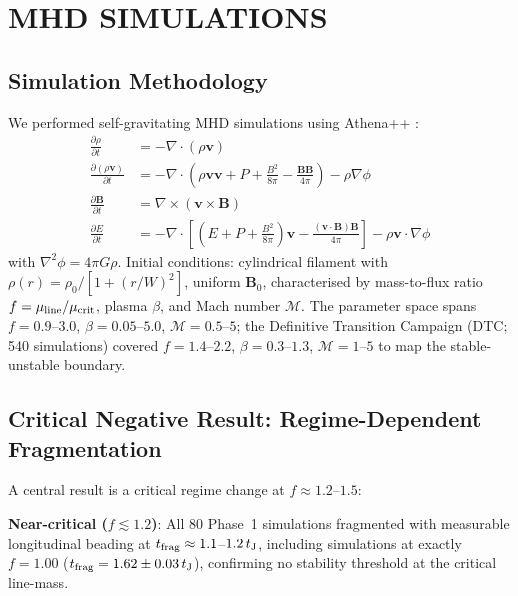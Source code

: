 \documentclass[twoside,twocolumn]{mnras}
\begin{document}
\section{MHD SIMULATIONS}

\subsection{Simulation Methodology}

We performed self-gravitating MHD simulations using Athena++ \citep{Stone2020}:
\begin{align}
\frac{\partial \rho}{\partial t} &= -\nabla \cdot (\rho \mathbf{v}) \\
\frac{\partial (\rho \mathbf{v})}{\partial t} &= -\nabla \cdot \left(\rho \mathbf{v} \mathbf{v} + P + \frac{B^2}{8\pi} - \frac{\mathbf{B}\mathbf{B}}{4\pi}\right) - \rho \nabla \phi \\
\frac{\partial \mathbf{B}}{\partial t} &= \nabla \times (\mathbf{v} \times \mathbf{B}) \\
\frac{\partial E}{\partial t} &= -\nabla \cdot \left[\left(E + P + \frac{B^2}{8\pi}\right)\mathbf{v} - \frac{(\mathbf{v} \cdot \mathbf{B})\mathbf{B}}{4\pi}\right] - \rho \mathbf{v} \cdot \nabla \phi
\end{align}
with $\nabla^2 \phi = 4\pi G\rho$. Initial conditions: cylindrical filament with
$\rho(r) = \rho_0 / [1 + (r/W)^2]$, uniform $\mathbf{B}_0$, characterised by
mass-to-flux ratio $f = \mu_{\rm line}/\mu_{\rm crit}$, plasma $\beta$, and
Mach number $\mathcal{M}$. The parameter space spans $f = 0.9$--$3.0$,
$\beta = 0.05$--$5.0$, $\mathcal{M} = 0.5$--$5$; the Definitive Transition Campaign
(DTC; 540 simulations) covered $f = 1.4$--$2.2$, $\beta = 0.3$--$1.3$,
$\mathcal{M} = 1$--$5$ to map the stable-unstable boundary.

\subsection{Critical Negative Result: Regime-Dependent Fragmentation}
\label{sec:critnat}

A central result is a critical regime change at $f \approx 1.2$--$1.5$:

\textbf{Near-critical ($f \lesssim 1.2$)}: All 80 Phase~1 simulations fragmented with
measurable longitudinal beading at $t_{\rm frag} \approx 1.1$--$1.2\,t_{\rm J}$,
including simulations at exactly $f = 1.00$ ($t_{\rm frag} = 1.62 \pm 0.03\,t_{\rm J}$),
confirming no stability threshold at the critical line-mass.
\end{document}

